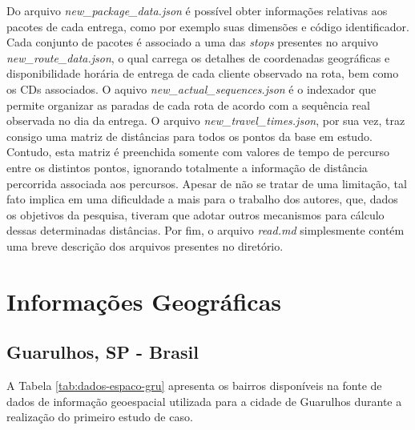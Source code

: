 Do arquivo \textit{new\_package\_data.json} é possível obter informações relativas aos pacotes de cada entrega, como por exemplo suas dimensões e código identificador.
%
Cada conjunto de pacotes é associado a uma das \textit{stops} presentes no arquivo \textit{new\_route\_data.json}, o qual carrega os detalhes de coordenadas geográficas e disponibilidade horária de entrega de cada cliente observado na rota, bem como os CDs associados.
%
O aquivo \textit{new\_actual\_sequences.json} é o indexador que permite organizar as paradas de cada rota de acordo com a sequência real observada no dia da entrega.
%
O arquivo \textit{new\_travel\_times.json}, por sua vez, traz consigo uma matriz de distâncias para todos os pontos da base em estudo.
%
Contudo, esta matriz é preenchida somente com valores de tempo de percurso entre os distintos pontos, ignorando totalmente a informação de distância percorrida associada aos percursos.
%
Apesar de não se tratar de uma limitação, tal fato implica em uma dificuldade a mais para o trabalho dos autores, que, dados os objetivos da pesquisa, tiveram que adotar outros mecanismos para cálculo dessas determinadas distâncias. Por fim, o arquivo \textit{read.md} simplesmente contém uma breve descrição dos arquivos presentes no diretório.

\chapter{Informações Geográficas}\label{sec:AppGIS}

\section{Guarulhos, SP - Brasil}

A Tabela \ref{tab:dados-espaco-gru} apresenta os bairros disponíveis na fonte de dados de informação geoespacial utilizada para a cidade de Guarulhos durante a realização do primeiro estudo de caso.


